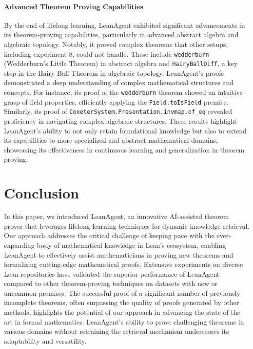 \documentclass{article} %
\begin{document}
\paragraph{Advanced Theorem Proving Capabilities}
By the end of lifelong learning, LeanAgent exhibited significant advancements in its theorem-proving capabilities, particularly in advanced abstract algebra and algebraic topology. Notably, it proved complex theorems that other setups, including experiment 8, could not handle. These include \texttt{wedderburn} (Wedderburn's Little Theorem) in abstract algebra and \texttt{HairyBallDiff}, a key step in the Hairy Ball Theorem in algebraic topology. LeanAgent's proofs demonstrated a deep understanding of complex mathematical structures and concepts. For instance, its proof of the \texttt{wedderburn} theorem showed an intuitive grasp of field properties, efficiently applying the \texttt{Field.toIsField} premise. Similarly, its proof of \texttt{CoxeterSystem.Presentation.invmap.of\_eq} revealed proficiency in navigating complex algebraic structures. These results highlight LeanAgent's ability to not only retain foundational knowledge but also to extend its capabilities to more specialized and abstract mathematical domains, showcasing its effectiveness in continuous learning and generalization in theorem proving.

\section{Conclusion}
In this paper, we introduced LeanAgent, an innovative AI-assisted theorem prover that leverages lifelong learning techniques for dynamic knowledge retrieval. Our approach addresses the critical challenge of keeping pace with the ever-expanding body of mathematical knowledge in Lean's ecosystem, enabling LeanAgent to effectively assist mathematicians in proving new theorems and formalizing cutting-edge mathematical proofs. Extensive experiments on diverse Lean repositories have validated the superior performance of LeanAgent compared to other theorem-proving techniques on datasets with new or uncommon premises. The successful proof of a significant number of previously incomplete theorems, often surpassing the quality of proofs generated by other methods, highlights the potential of our approach in advancing the state of the art in formal mathematics. LeanAgent's ability to prove challenging theorems in various domains without retraining the retrieval mechanism underscores its adaptability and versatility.
\end{document}
